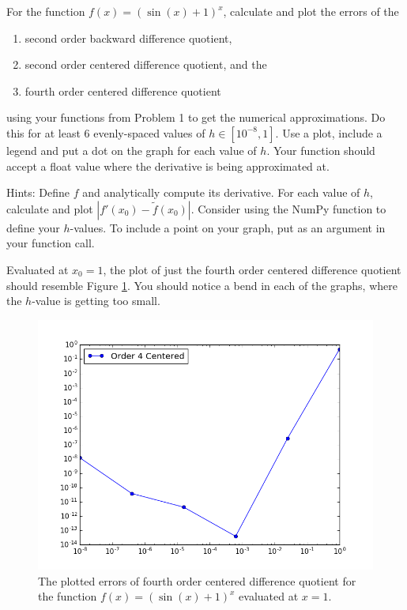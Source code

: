 \begin{problem}
For the function $f(x) = (\sin(x)+1)^x$, calculate and plot the errors of the
\begin{enumerate}
\item second order backward difference quotient,
\item second order centered difference quotient, and the
\item fourth order centered difference quotient
\end{enumerate}
using your functions from Problem 1 to get the numerical approximations.
Do this for at least 6 evenly-spaced values of $h \in [10^{-8}, 1]$.
Use a  plot, include a legend and put a dot on the graph for each value of $h$.
Your function should accept a float value where the derivative is being approximated at.

Hints: Define $f$ and analytically compute its derivative.
For each value of $h$, calculate and plot $|f'(x_0)-\tilde{f}(x_0)|$.
Consider using the NumPy function  to define your $h$-values.
To include a point on your graph, put  as an argument in your  function call.

Evaluated at $x_0 = 1$, the plot of just the fourth order centered difference quotient should resemble Figure \ref{fig:errors}. You should notice a bend in each of the graphs, where the $h$-value is getting too small.

\begin{figure}[H]
\centering
\includegraphics[width=\linewidth]{error_plot.png}
\caption{The plotted errors of fourth order centered difference quotient for the function $f(x) = (\sin(x)+1)^x$ evaluated at $x=1$.}
\label{fig:errors}
\end{figure}

\end{problem}

